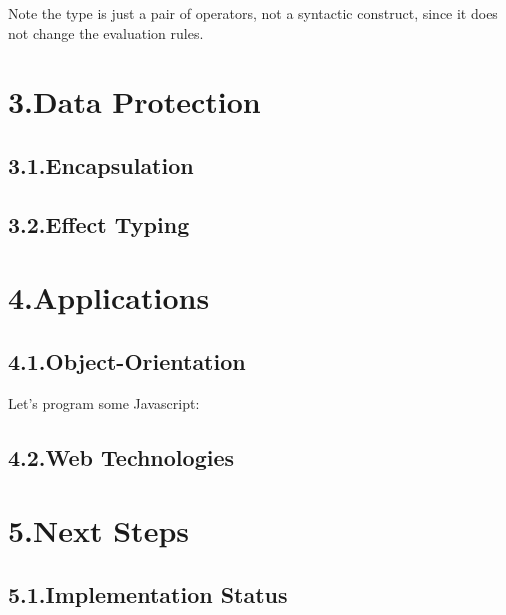 \documentclass[preprint]{{sigplanconf}}
\begin{document}
Note the type is just a pair of operators, not a syntactic construct,
since it does not change the evaluation rules.%

\section{3.\hspace*{0.5em}Data Protection}\label{sec-data-protection}%

\subsection{3.1.\hspace*{0.5em}Encapsulation}\label{sec-encapsulation}%

\subsection{3.2.\hspace*{0.5em}Effect Typing}\label{sec-effect-typing}%

\section{4.\hspace*{0.5em}Applications}\label{sec-applications}%

\subsection{4.1.\hspace*{0.5em}Object-Orientation}\label{sec-object-orientation}%

\noindent Let's program some Javascript:%

\subsection{4.2.\hspace*{0.5em}Web Technologies}\label{sec-web-technologies}%

\section{5.\hspace*{0.5em}Next Steps}\label{sec-next-steps}%

\subsection{5.1.\hspace*{0.5em}Implementation Status}\label{sec-implementation-status}%
\end{document}
